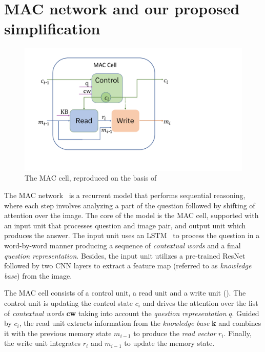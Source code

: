 \section{MAC network and our proposed simplification}

\begin{figure}
	\vspace{-15pt}
	\centering
	\includegraphics[width=\textwidth]{img/mac_cell.pdf}
	\caption{The MAC cell, reproduced on the basis of~\cite{hudson2018compositional}}
	\label{fig:mac_cell}
	\vspace{-5pt}
\end{figure}

The MAC network~\cite{hudson2018compositional} is a recurrent model that performs sequential reasoning, where each step involves analyzing a part of the question followed by shifting of attention over the image.
The core of the model is the MAC cell, supported with an input unit that processes question and image pair, and output unit which produces the answer.%
The input unit  uses an LSTM~\cite{hochreiter1997long} to process the question in a word-by-word manner producing a sequence of \emph{contextual words} and a final \emph{question representation}.
Besides, the input unit utilizes a pre-trained ResNet~\cite{he2016resnet} followed by two CNN layers to extract a feature map (referred to as \emph{knowledge base}) from the image.

	
The MAC cell consists of a control unit, a read unit and a write unit ().
The control unit is updating the control state $c_i$ and drives the attention over the list of \emph{contextual words} \textbf{cw} taking into account the \emph{question representation} $q$.
Guided by $c_i$,  the read unit extracts information from the \emph{knowledge base} \textbf{k} and combines it with the previous memory state $m_{i-1}$  to produce the \emph{read vector} $r_i$.
Finally, the write unit integrates $r_i$ and $m_{i-1}$ to update the memory state.

